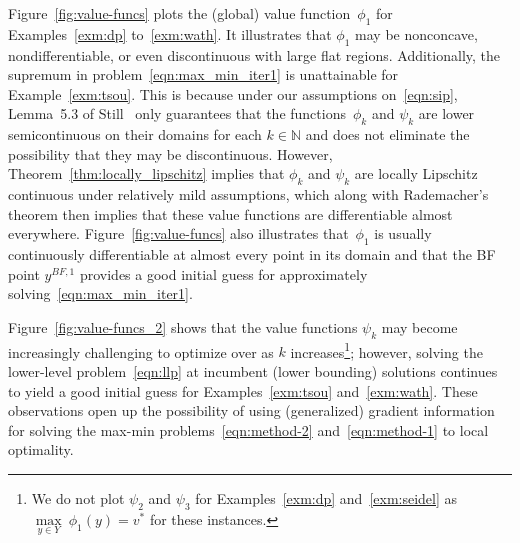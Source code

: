 \documentclass{article}
\newcommand{\uset}[2]{\ensuremath{\underset{#1}{#2}}}
\newcommand{\N}{\mathbb{N}}
\newcommand{\1}[1]{\mathds{1}\left[#1\right]}
\begin{document}
Figure~\ref{fig:value-funcs} plots the (global) value function~$\phi_1$ for Examples~\ref{exm:dp} to~\ref{exm:wath}.
It illustrates that $\phi_1$ may be nonconcave, nondifferentiable, or even discontinuous with large flat regions.
Additionally, the supremum in problem~\eqref{eqn:max_min_iter1} is unattainable for Example~\ref{exm:tsou}.
This is because under our assumptions on~\eqref{eqn:sip}, Lemma~5.3 of Still~\cite{still2018lectures} only guarantees that the functions~$\phi_k$ and $\psi_k$ are lower semicontinuous on their domains for each $k \in \N$ and does not eliminate the possibility that they may be discontinuous.
However, Theorem~\ref{thm:locally_lipschitz} implies that $\phi_k$ and $\psi_k$ are locally Lipschitz continuous under relatively mild assumptions, which along with Rademacher's theorem then implies that these value functions are differentiable almost everywhere.
Figure~\ref{fig:value-funcs} also illustrates that~$\phi_1$ is usually continuously differentiable at almost every point in its domain and that the BF point $y^{BF,1}$ provides a good initial guess for approximately solving~\eqref{eqn:max_min_iter1}.

Figure~\ref{fig:value-funcs_2} shows that the value functions $\psi_k$ may become increasingly challenging to optimize over as $k$ increases\footnote{We do not plot $\psi_2$ and $\psi_3$ for Examples~\ref{exm:dp} and~\ref{exm:seidel} as $\uset{y \in Y}{\max} \: \phi_1(y) = v^*$ for these instances.}; however, solving the lower-level problem~\eqref{eqn:llp} at incumbent (lower bounding) solutions continues to yield a good initial guess for Examples~\ref{exm:tsou} and~\ref{exm:wath}.
These observations open up the possibility of using (generalized) gradient information for solving the max-min problems~\eqref{eqn:method-2} and~\eqref{eqn:method-1} to local optimality.
\end{document}

